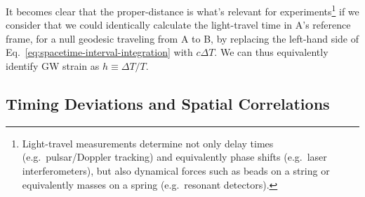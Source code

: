 \documentclass[onecolumn,authoryear]{els-mrw}
\begin{document}
It becomes clear that the proper-distance is what's relevant for experiments\footnote{Light-travel measurements determine not only delay times (e.g.~pulsar/Doppler tracking) and equivalently phase shifts (e.g.~laser interferometers), but also dynamical forces such as beads on a string or equivalently masses on a spring (e.g.~resonant detectors).} if we consider that we could identically calculate the light-travel time in A's reference frame, for a null geodesic traveling from A to B, by replacing the left-hand side of Eq.~\ref{eq:spacetime-interval-integration} with $c \Delta T$.  We can thus equivalently identify GW strain as \mbox{$h \equiv \Delta T / T$}.

\subsection{Timing Deviations and Spatial Correlations}\label{sec:timing-deviations-spatial-correlations}

\end{document}
